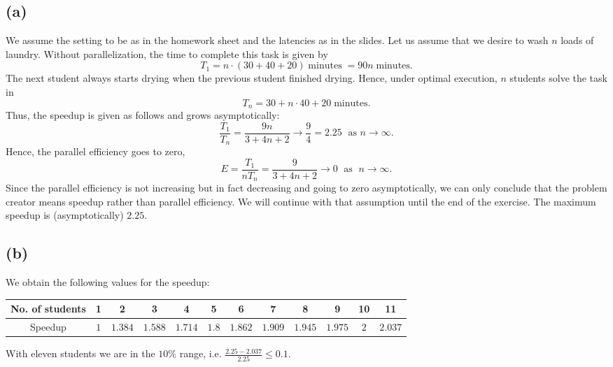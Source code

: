 \subsection*{(a)}
We assume the setting to be as in the homework sheet and the latencies as in the slides. Let us assume that we desire to wash $n$ loads of laundry. Without parallelization, the time to complete this task is given by
\[
T_1 = n \cdot (30 + 40 + 20) \; \text{minutes} \; = 90n \; \text{minutes}.
\]
The next student always starts drying when the previous student finished drying. Hence, under optimal execution, $n$ students solve the task in
\[
T_n = 30 + n \cdot 40 + 20 \; \text{minutes}.
\]
Thus, the speedup is given as follows and grows asymptotically: 
\[
\frac{T_1}{T_n} =\frac{9n}{3 + 4n + 2} \rightarrow \frac{9}{4} = 2.25 \; \text{ as } n \to \infty.
\]
Hence, the parallel efficiency goes to zero,
\[
E = \frac{T_1}{n T_n} = \frac{9}{3 + 4n + 2} \rightarrow 0 \; \text{ as } \; n \to \infty.
\]
Since the parallel efficiency is not increasing but in fact decreasing and going to zero asymptotically, we can only conclude that the problem creator means speedup rather than parallel efficiency. We will continue with that assumption until the end of the exercise. The maximum speedup is (asymptotically) $2.25$.

\subsection*{(b)}
\FloatBarrier
We obtain the following values for the speedup:


\begin{center}
\begin{tabular}{c|c|c|c|c|c|c|c|c|c|c|c|}
No. of students & 1 & 2 & 3 & 4 & 5 & 6 & 7 & 8 & 9 & 10 & 11 \\ 
\hline 
Speedup & $1$ & $1.384$ & $1.588$ & $1.714$ & $1.8$ & $1.862$ & $1.909$ & $1.945$ & $1.975$ & $2$ & $2.037$ \\ 
\hline 
\end{tabular}
\end{center}

With eleven students we are in the $10\%$ range, i.e. $\frac{2.25 - 2.037}{2.25} \leq 0.1$.

